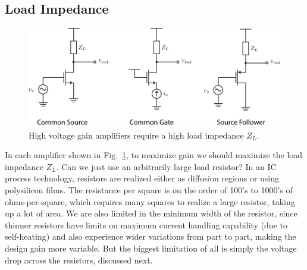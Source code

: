 \subsection{Load Impedance}
\begin{figure}[tb]
\centering
\includegraphics[width=1\columnwidth]{0highZload.pdf}
\caption{High voltage gain amplifiers require a high load impedance $Z_L$.}
\label{fig:0highZload.pdf}
\end{figure}
In each amplifier shown in Fig.~\ref{fig:0highZload.pdf}, to maximize gain we should maximize the load impedance $Z_L$.   Can we just use an arbitrarily large load resistor?  In an IC process technology, resistors are realized either as diffusion regions or using polysilicon films.  The resistance per square is on the order of 100's to 1000's of ohms-per-square, which requires many squares to realize a large resistor, taking up a lot of area.  We are also limited in the minimum width of the resistor, since thinner resistors have limits on maximum current handling capability (due to self-heating) and also experience wider variations from part to part, making the design gain more variable.  But the biggest limitation of all is simply the voltage drop across the resistors, discussed next. 
